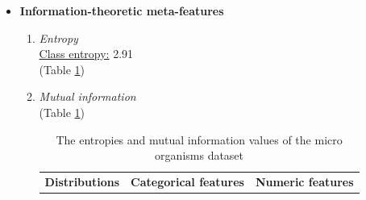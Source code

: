 \documentclass[10pt,a4paper]{article}
\begin{document}
\begin{itemize}
\begin{enumerate}
			\underline{Explained variation component 1:} 0.14 \\
			\underline{Explained variation component 2:} 0.10 \\
			\underline{Explained variation component 3:} 0.08 \\
			\underline{Eigenvalue component 1:} 112301000896299.64 \\
			\underline{Eigenvalue component 2:} 83271983089506.69 \\
			\underline{Eigenvalue component 3:} 63192806579339.62 \\
			\underline{Determinant value:} $\infty$ \\
		\end{enumerate}
		\item \textbf{Information-theoretic meta-features} \\ 
		\begin{enumerate}
			\item \textit{Entropy} \\
			\underline{Class entropy:} 2.91 \\
			(Table \ref{tab:EntropyMIMODataset})
			\item \textit{Mutual information} \\
			(Table \ref{tab:EntropyMIMODataset})
			\begin{table}[h!]
				\caption{The entropies and mutual information values of the micro organisms dataset}
				\label{tab:EntropyMIMODataset}
				\begin{tabular}{l|llllll}
					\multirow{2}{*}{\textbf{Distributions}} & \multicolumn{3}{l}{\textbf{Categorical features}}                                                                                                                                                                                    & \multicolumn{3}{l}{\textbf{Numeric features}}                                                                                                                                                                   \\ \cline{2-7} 

\end{tabular}
\end{table}
\end{enumerate}
\end{itemize}
\end{document}
